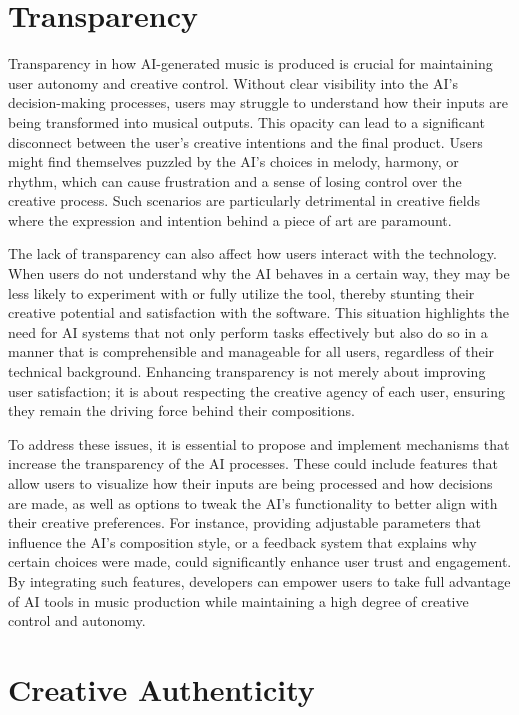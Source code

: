 \documentclass[10pt,twocolumn]{article}
\begin{document}
\section{Transparency}

Transparency in how AI-generated music is produced is crucial for maintaining user autonomy and creative control. Without clear visibility into the AI's decision-making processes, users may struggle to understand how their inputs are being transformed into musical outputs. This opacity can lead to a significant disconnect between the user's creative intentions and the final product. Users might find themselves puzzled by the AI's choices in melody, harmony, or rhythm, which can cause frustration and a sense of losing control over the creative process. Such scenarios are particularly detrimental in creative fields where the expression and intention behind a piece of art are paramount.

The lack of transparency can also affect how users interact with the technology. When users do not understand why the AI behaves in a certain way, they may be less likely to experiment with or fully utilize the tool, thereby stunting their creative potential and satisfaction with the software. This situation highlights the need for AI systems that not only perform tasks effectively but also do so in a manner that is comprehensible and manageable for all users, regardless of their technical background. Enhancing transparency is not merely about improving user satisfaction; it is about respecting the creative agency of each user, ensuring they remain the driving force behind their compositions.

To address these issues, it is essential to propose and implement mechanisms that increase the transparency of the AI processes. These could include features that allow users to visualize how their inputs are being processed and how decisions are made, as well as options to tweak the AI's functionality to better align with their creative preferences. For instance, providing adjustable parameters that influence the AI's composition style, or a feedback system that explains why certain choices were made, could significantly enhance user trust and engagement. By integrating such features, developers can empower users to take full advantage of AI tools in music production while maintaining a high degree of creative control and autonomy.
\section{Creative Authenticity}
\end{document}

